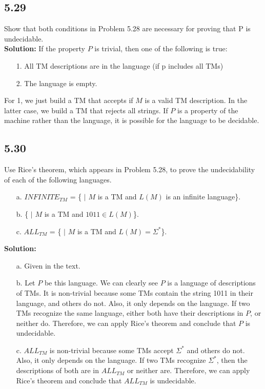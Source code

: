 \subsection*{5.29} Show that both conditions in Problem 5.28 are necessary for proving that P is undecidable.
\\
\textbf{Solution:} If the property $P$ is trivial, then one of the following is true:
\begin{enumerate}
\item[1.]All TM descriptions are in the language (if p includes all TMs)
\item[2.]The language is empty. 
\end{enumerate}
For 1, we just build a TM that accepts if $M$ is a valid TM description. In the latter case, we build a TM that rejects all strings. If $P$ is a property of the machine rather than the language, it is possible for the language to be decidable.

\subsection*{5.30} Use Rice's theorem, which appears in Problem 5.28, to prove the undecidability of each of the following languages.
\begin{enumerate}
\item[a.]$INFINITE_{TM}$ = \{ $|$ $M$ is a TM and $L(M)$ is an infinite language\}.
\item[b.]\{ $|$ $M$ is a TM and $1011 \in L(M)$\}.
\item[c.]$ALL_{TM}$ = \{ $|$ $M$ is a TM and $L(M) = \Sigma^*$\}.
\end{enumerate}
\textbf{Solution:}
\begin{enumerate}
\item[a.]Given in the text.
\item[b.]Let $P$ be this language. We can clearly see $P$ is a language of descriptions of TMs. It is non-trivial because some TMs contain the string 1011 in their language, and others do not. Also, it only depends on the language. If two TMs recognize the same language, either both have their descriptions in $P$, or neither do. Therefore, we can apply Rice's theorem and conclude that $P$ is undecidable.
\item[c.]$ALL_{TM}$ is non-trivial because some TMs accept $\Sigma^*$ and others do not. Also, it only depends on the language. If two TMs recognize $\Sigma^*$, then the descriptions of both are in $ALL_{TM}$ or neither are. Therefore, we can apply Rice's theorem and conclude that $ALL_{TM}$ is undecidable.
\end{enumerate}